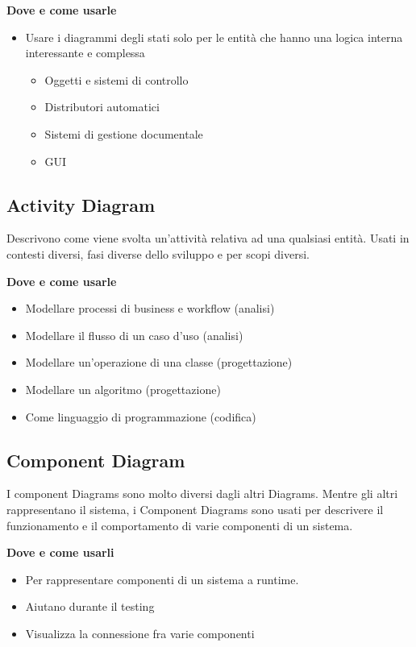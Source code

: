 \vspace{2mm}
\noindent \textbf{Dove e come usarle}
\begin{itemize}
    \item Usare i diagrammi degli stati solo per le entità che hanno una logica interna interessante e complessa
    \begin{itemize}
        \item Oggetti e sistemi di controllo
        \item Distributori automatici
        \item Sistemi di gestione documentale
        \item GUI
    \end{itemize}
\end{itemize}

\subsection{Activity Diagram}
Descrivono come viene svolta un’attività relativa ad una qualsiasi entità. Usati in contesti diversi, fasi diverse dello sviluppo e per scopi diversi.

\vspace{2mm}
\noindent \textbf{Dove e come usarle}
\begin{itemize}
    \item Modellare processi di business e workflow (analisi)
    \item Modellare il flusso di un caso d’uso (analisi)
    \item Modellare un’operazione di una classe (progettazione)
    \item Modellare un algoritmo (progettazione)
    \item Come linguaggio di programmazione (codifica)
\end{itemize}

\subsection{Component Diagram}
I component Diagrams sono molto diversi dagli altri Diagrams. Mentre gli altri rappresentano il sistema, i Component Diagrams sono usati per descrivere il funzionamento e il comportamento di varie componenti di un sistema.

\vspace{2mm}
\noindent \textbf{Dove e come usarli}
\begin{itemize}
    \item Per rappresentare componenti di un sistema a runtime.
    \item Aiutano durante il testing
    \item Visualizza la connessione fra varie componenti
\end{itemize}


